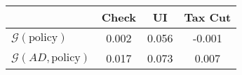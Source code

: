 \begin{tabular}{@{}lccc@{}} 
\toprule 
                          & Check      & UI    & Tax Cut    \\  \midrule 
$\mathcal{G}(\text{policy})$ & 0.002  & 0.056  & -0.001     \\ 
$\mathcal{G}(AD,\text{policy})$ & 0.017  & 0.073  & 0.007     \\ 
\end{tabular}  
